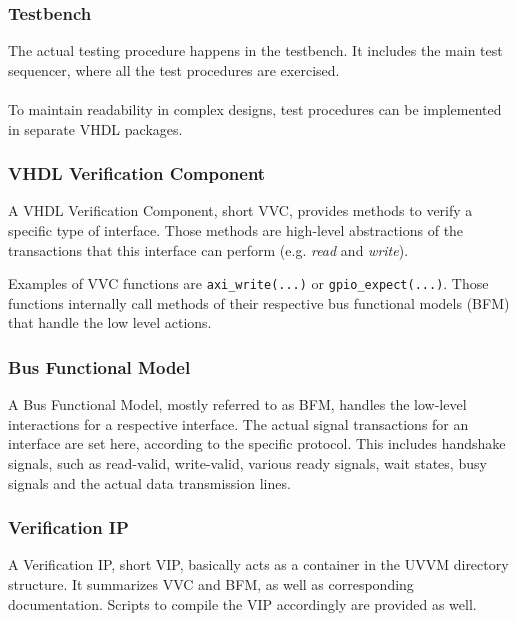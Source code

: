 \subsubsection{Testbench}

The actual testing procedure happens in the testbench. It includes the main test sequencer, where all the test procedures are exercised.\\
\\
To maintain readability in complex designs, test procedures can be implemented in separate VHDL packages.

\subsubsection{VHDL Verification Component}

A VHDL Verification Component, short VVC, provides methods to verify a specific type of interface. Those methods are high-level abstractions of the transactions that this interface can perform (e.g. \textit{read} and \textit{write}).


Examples of VVC functions are \texttt{axi\_write(...)} or \texttt{gpio\_expect(...)}. Those functions internally call methods of their respective bus functional models (BFM) that handle the low level actions.

\subsubsection{Bus Functional Model}

A Bus Functional Model, mostly referred to as BFM, handles the low-level interactions for a respective interface. The actual signal transactions for an interface are set here, according to the specific protocol. This includes handshake signals, such as read-valid, write-valid, various ready signals, wait states, busy signals and the actual data transmission lines.

\subsubsection{Verification IP}

A Verification IP, short VIP, basically acts as a container in the UVVM directory structure. It summarizes VVC and BFM, as well as corresponding documentation. Scripts to compile the VIP accordingly are provided as well.



\newpage
